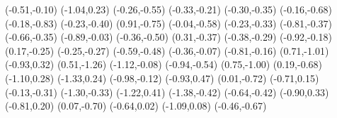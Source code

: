 \psdot[](-0.51,-0.10)
\psdot[](-1.04,0.23)
\psdot[](-0.26,-0.55)
\psdot[](-0.33,-0.21)
\psdot[](-0.30,-0.35)
\psdot[](-0.16,-0.68)
\psdot[](-0.18,-0.83)
\psdot[](-0.23,-0.40)
\psdot[](0.91,-0.75)
\psdot[](-0.04,-0.58)
\psdot[](-0.23,-0.33)
\psdot[](-0.81,-0.37)
\psdot[](-0.66,-0.35)
\psdot[](-0.89,-0.03)
\psdot[](-0.36,-0.50)
\psdot[](0.31,-0.37)
\psdot[](-0.38,-0.29)
\psdot[](-0.92,-0.18)
\psdot[](0.17,-0.25)
\psdot[](-0.25,-0.27)
\psdot[](-0.59,-0.48)
\psdot[](-0.36,-0.07)
\psdot[](-0.81,-0.16)
\psdot[](0.71,-1.01)
\psdot[](-0.93,0.32)
\psdot[](0.51,-1.26)
\psdot[](-1.12,-0.08)
\psdot[](-0.94,-0.54)
\psdot[](0.75,-1.00)
\psdot[](0.19,-0.68)
\psdot[](-1.10,0.28)
\psdot[](-1.33,0.24)
\psdot[](-0.98,-0.12)
\psdot[](-0.93,0.47)
\psdot[](0.01,-0.72)
\psdot[](-0.71,0.15)
\psdot[](-0.13,-0.31)
\psdot[](-1.30,-0.33)
\psdot[](-1.22,0.41)
\psdot[](-1.38,-0.42)
\psdot[](-0.64,-0.42)
\psdot[](-0.90,0.33)
\psdot[](-0.81,0.20)
\psdot[](0.07,-0.70)
\psdot[](-0.64,0.02)
\psdot[](-1.09,0.08)
\psdot[](-0.46,-0.67)

